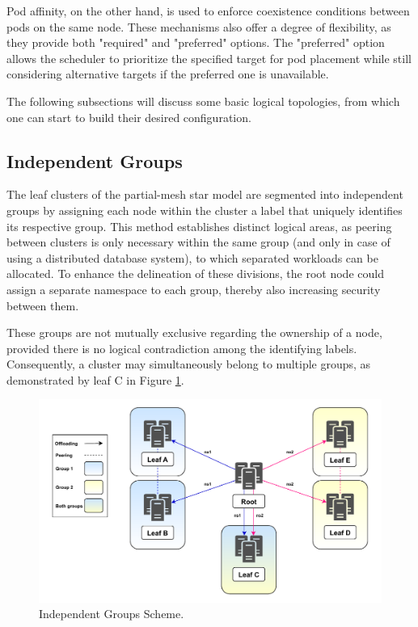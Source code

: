 Pod affinity, on the other hand, is used to enforce coexistence conditions between pods on the same node. These mechanisms also offer a degree of flexibility, as they provide both "required" and "preferred" options. The "preferred" option allows the scheduler to prioritize the specified target for pod placement while still considering alternative targets if the preferred one is unavailable.

The following subsections will discuss some basic logical topologies, from which one can start to build their desired configuration.

\subsection{Independent Groups}\label{sec:indipendent-groups}
The leaf clusters of the partial-mesh star model are segmented into independent groups by assigning each node within the cluster a label that uniquely identifies its respective group. This method establishes distinct logical areas, as peering between clusters is only necessary within the same group (and only in case of using a distributed database system), to which separated workloads can be allocated. To enhance the delineation of these divisions, the root node could assign a separate namespace to each group, thereby also increasing security between them.

These groups are not mutually exclusive regarding the ownership of a node, provided there is no logical contradiction among the identifying labels. Consequently, a cluster may simultaneously belong to multiple groups, as demonstrated by leaf C in Figure \ref{fig:group-ind}.

\begin{figure}[ht]\centering
\includegraphics[scale=0.7]{Pictures/Group-v6}
\caption{Independent Groups Scheme.}\label{fig:group-ind}
\end{figure}


